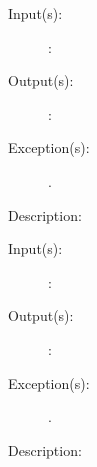 \begin{description}
\begin{description}
	\end{description}
\label{thd_}
\item[{\cfunc[]{thd\_}{}}: ]
	\begin{description}\item[]
	\item[Input(s): ]
		\begin{description}\item[]
		\item[: ]
		\end{description}
	\item[Output(s): ]
		\begin{description}\item[]
		\item[: ]
		\end{description}
	\item[Exception(s): ]
		\begin{description}\item[]
		\item[.]
		\end{description}
	\item[Description: ]
	\end{description}
\label{thd_}
\item[{\cfunc[]{thd\_}{}}: ]
	\begin{description}\item[]
	\item[Input(s): ]
		\begin{description}\item[]
		\item[: ]
		\end{description}
	\item[Output(s): ]
		\begin{description}\item[]
		\item[: ]
		\end{description}
	\item[Exception(s): ]
		\begin{description}\item[]
		\item[.]
		\end{description}
	\item[Description: ]
	\end{description}
\label{thd_}
\item[{\cfunc[]{thd\_}{}}: ]
	\begin{description}\item[]

\end{description}
\end{description}
